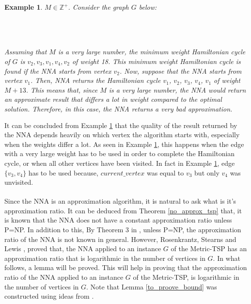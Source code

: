 \documentclass[12pt]{article}
\newtheorem{example}[definition]{Example}
\numberwithin{equation}{subsection}
\numberwithin{table}{subsection}
\numberwithin{algorithm}{subsection}
\begin{document}
\begin{example}
\label{nna_fail}
 $M \in \mathbb{Z}^+$. Consider the graph $G$ below:
\\\\
\\\\
Assuming that $M$ is a very large number, the minimum weight Hamiltonian cycle of $G$ is $v_2, v_3, v_1, v_4, v_2$ of weight 18. This minimum weight Hamiltonian cycle is found if the NNA starts from vertex $v_2$. Now, suppose that the NNA starts from vertex $v_1$. Then, NNA returns the Hamiltonian cycle $v_1$, $v_2$, $v_3$, $v_4$, $v_1$ of weight $M + 13$. This means that, since $M$ is a very large number, the NNA would return an approximate result that differs a lot in weight compared to the optimal solution. Therefore, in this case, the NNA returns a very bad approximation.
\end{example}
It can be concluded from Example \ref{nna_fail} that the quality of the result returned by the NNA depends heavily on which vertex the algorithm starts with, especially when the weights differ a lot. As seen in Example \ref{nna_fail}, this happens when the edge with a very large weight has to be used in order to complete the Hamiltonian cycle, or when all other vertices have been visited. In fact in Example \ref{nna_fail}, edge $\{v_3, v_4\}$ has to be used because, $current\_vertex$ was equal to $v_3$ but only $v_4$ was unvisited.\\\\
Since the NNA is an approximation algorithm, it is natural to ask what is it's approximation ratio. It can be deduced from Theorem \ref{no_approx_tsp} that, it is known that the NNA does not have a constant approximation ratio unless P=NP. In addition to this, By Theorem 3 in \cite{chekuri_im_2011}, unless P=NP, the approximation ratio of the NNA is not known in general. However, Rosenkrantz, Stearns and Lewis \cite{Rosenkrantz}, proved that, the NNA applied to an instance $G$ of the Metric-TSP has an approximation ratio that is logarithmic in the number of vertices in $G$. In what follows, a lemma will be proved. This will help in proving that the approximation ratio of the NNA applied to an instance $G$ of the Metric-TSP, is logarithmic in the number of vertices in $G$. Note that Lemma \ref{to_proove_bound} was constructed using ideas from \cite{Rosenkrantz}.
\end{document}
